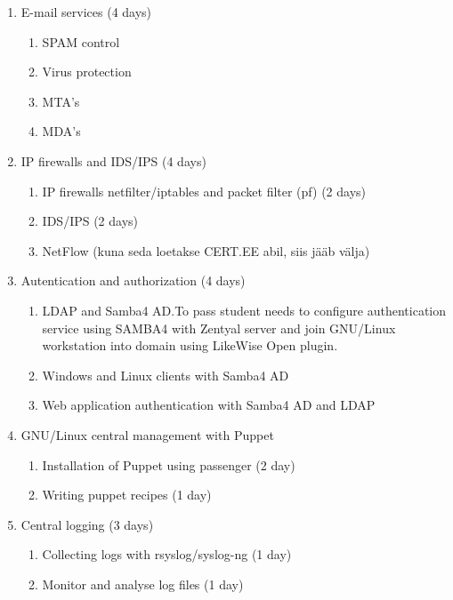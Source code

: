  \begin{enumerate}
 
     \item E-mail services (4 days)
    \begin{enumerate}[label=LAB \arabic*.,leftmargin=*]
  		\item SPAM control
	  	\item Virus protection
  		\item MTA's 
	  	\item MDA's
    \end{enumerate}
    \item IP firewalls and IDS/IPS (4 days)
        \begin{enumerate}[label=LAB \arabic*.,leftmargin=*]
  		\item IP firewalls netfilter/iptables and packet filter (pf) (2 days)
	  	\item IDS/IPS (2 days)
  		\item NetFlow (kuna seda loetakse CERT.EE abil, siis jääb välja)
		\end{enumerate}
    \item Autentication and authorization (4 days)
        \begin{enumerate}[label=LAB \arabic*.,leftmargin=*]
  		\item LDAP and Samba4 AD.To pass student needs to configure authentication service using SAMBA4 with Zentyal server and join GNU/Linux workstation into domain using LikeWise Open plugin.
	  	\item Windows and Linux clients with Samba4 AD 
  		\item Web application authentication with Samba4 AD and LDAP
    		\end{enumerate}
    \item GNU/Linux central management with Puppet
        \begin{enumerate}[label=LAB \arabic*.,leftmargin=*]
	  		\item Installation of Puppet using passenger (2 day)
		  	\item Writing puppet recipes (1 day)
    		\end{enumerate}
    	\item Central logging (3 days)
    	    \begin{enumerate}[label=LAB \arabic*.,leftmargin=*]
	  		\item Collecting logs with rsyslog/syslog-ng (1 day)
		  	\item Monitor and analyse log files (1 day)
    		\end{enumerate}
 \end{enumerate}
 